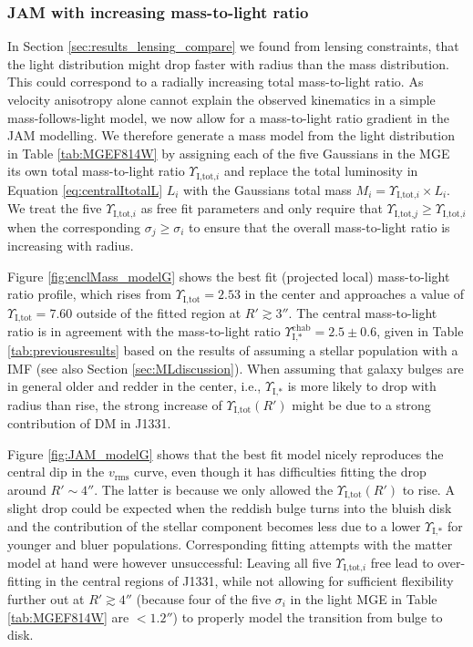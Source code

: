 \documentclass[useAMS,usenatbib]{mnras}
\begin{document}
\subsubsection{JAM with increasing mass-to-light ratio} \label{sec:results_JAM_SB_gradient}

In Section \ref{sec:results_lensing_compare} we found from lensing constraints, that the light distribution might drop faster with radius than the mass distribution. This could correspond to a radially increasing total mass-to-light ratio. As velocity anisotropy alone cannot explain the observed kinematics in a simple mass-follows-light model, we now allow for a mass-to-light ratio gradient in the JAM modelling. We therefore generate a mass model from the light distribution in Table \ref{tab:MGEF814W} by assigning each of the five Gaussians in the MGE its own total mass-to-light ratio $\Upsilon_{\text{I,tot,}i}$ and replace the total luminosity in Equation \eqref{eq:centralItotalL} $L_i$ with the Gaussians total mass $M_i = \Upsilon_{\text{I,tot,}i} \times L_i$. We treat the five $\Upsilon_{\text{I,tot,}i}$ as free fit parameters and only require that $\Upsilon_{\text{I,tot,}j} \geq \Upsilon_{\text{I,tot,}i}$ when the corresponding $\sigma_j \geq \sigma_i$ to ensure that the overall mass-to-light ratio is increasing with radius.

Figure \ref{fig:enclMass_modelG} shows the best fit (projected local) mass-to-light ratio profile, which rises from $\Upsilon_\text{I,tot} = 2.53$ in the center and approaches a value of $\Upsilon_\text{I,tot} = 7.60$ outside of the fitted region at $R'\gtrsim 3''$. The central mass-to-light ratio is in agreement with the mass-to-light ratio $\Upsilon_\text{I,*}^\text{chab} = 2.5 \pm 0.6$, given in Table \ref{tab:previousresults} based on the results of \citet{SWELLSI} assuming a stellar population with a \citet{Chabrier2003} IMF (see also Section \ref{sec:MLdiscussion}). When assuming that galaxy bulges are in general older and redder in the center, i.e., $\Upsilon_\text{I,*}$ is more likely to drop with radius than rise, the strong increase of $\Upsilon_\text{I,tot}(R')$ might be due to a strong contribution of DM in J1331.

Figure \ref{fig:JAM_modelG} shows that the best fit model nicely reproduces the central dip in the $v_\text{rms}$ curve, even though it has difficulties fitting the drop around $R' \sim 4''$. The latter is because we only allowed the $\Upsilon_\text{I,tot}(R')$ to rise. A slight drop could be expected when the reddish bulge turns into the bluish disk and the contribution of the stellar component becomes less due to a lower $\Upsilon_\text{I,*}$ for younger and bluer populations. Corresponding fitting attempts with the matter model at hand were however unsuccessful: Leaving all five $\Upsilon_{\text{I,tot,}i}$ free lead to over-fitting in the central regions of J1331, while not allowing for sufficient flexibility further out at $R'\gtrsim4''$ (because four of the five $\sigma_i$ in the light MGE in Table \ref{tab:MGEF814W} are $< 1.2''$) to properly model the transition from bulge to disk.
\end{document}
